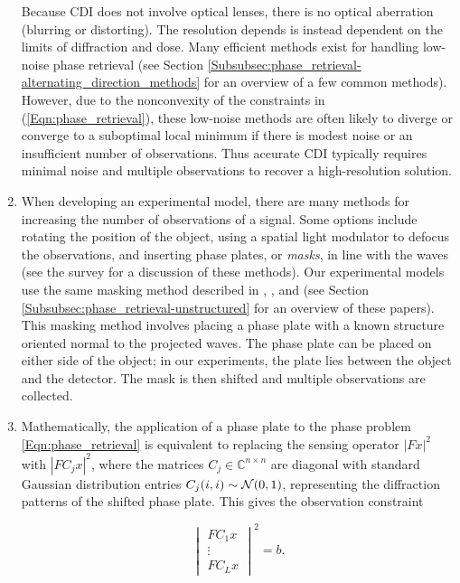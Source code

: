 \begin{enumerate}
Because CDI does not involve optical lenses, there is no optical aberration (blurring or distorting).  The resolution depends is instead dependent on the limits of diffraction and dose.  Many efficient methods exist for handling low-noise phase retrieval (see Section \ref{Subsubsec:phase_retrieval-alternating_direction_methods} for an overview of a few common methods).  However, due to the nonconvexity of the constraints in (\ref{Eqn:phase_retrieval}), these low-noise methods are often likely to diverge or converge to a suboptimal local minimum if there is modest noise or an insufficient number of observations.  Thus accurate CDI typically requires minimal noise and multiple observations to recover a high-resolution solution.


\item

When developing an experimental model, there are many methods for increasing the number of observations of a signal.  Some options include rotating the position of the object, using a spatial light modulator to defocus the observations, and inserting phase plates, or \textit{masks}, in line with the waves (see the survey \cite{duadi2011digital} for a discussion of these methods).  Our experimental models use the same masking method described in \cite[Section 2]{DBLP:journals/siamis/CandesESV13}, \cite[Sections 4.2, 4.3]{DBLP:journals/tit/CandesLS15}, and \cite[Section 5.1]{DBLP:journals/siamsc/FriedlanderM16} (see Section \ref{Subsubsec:phase_retrieval-unstructured} for an overview of these papers).  This masking method involves placing a phase plate with a known structure oriented normal to the projected waves.  The phase plate can be placed on either side of the object; in our experiments, the plate lies between the object and the detector.  The mask is then shifted and multiple observations are collected.



\item
Mathematically, the application of a phase plate to the phase problem \ref{Eqn:phase_retrieval} is equivalent to replacing the sensing operator $|Fx|^2$ with $|FC_jx|^2$, where the matrices $C_j \in \mathbb{C}^{n \times n}$ are diagonal with standard Gaussian distribution entries $C_j(i,i) \sim {\mathcal N}(0, 1)$, representing the diffraction patterns of the shifted phase plate.  This gives the observation constraint

\begin{equation}		\label{Eqn:FCx}
	\begin{vmatrix}
		FC_1x \\ \vdots \\ FC_Lx
	\end{vmatrix}^2
	= b.
\end{equation}


\end{enumerate}
